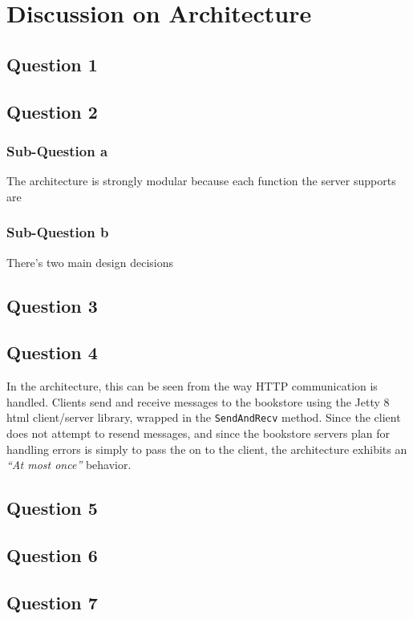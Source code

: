 
\section{Discussion on Architecture}

\subsection{Question 1}

\subsection{Question 2}

\subsubsection{Sub-Question a}

The architecture is strongly modular because each function the server supports are

\subsubsection{Sub-Question b}

There's two main design decisions

\subsection{Question 3}

\subsection{Question 4}

In the architecture, this can be seen from the way HTTP communication is handled. Clients send and receive messages to the bookstore using the Jetty 8 html client/server library, wrapped in the {\tt SendAndRecv} method. Since the client does not attempt to resend messages, and since the bookstore servers plan for handling errors is simply to pass the on to the client, the architecture exhibits an {\it ``At most once''} behavior.

\subsection{Question 5}

\subsection{Question 6}

\subsection{Question 7}


